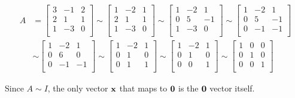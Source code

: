 \documentclass[12pt]{article}
\renewcommand{\vec}[1]{
  {\bf #1}
}
\begin{document}
  {
    \begin{align*}
      A &=
      \begin{bmatrix}
        3 & -1 & 2 \\
        2 &  1 & 1 \\
        1 & -3 & 0 \\
      \end{bmatrix}
      \sim 
      \begin{bmatrix}
        1 & -2 & 1 \\
        2 &  1 & 1 \\
        1 & -3 & 0 \\
      \end{bmatrix}
      \sim 
      \begin{bmatrix}
        1 & -2 &  1 \\
        0 &  5 & -1 \\
        1 & -3 &  0 \\
      \end{bmatrix}
      \sim 
      \begin{bmatrix}
        1 & -2 &  1 \\
        0 &  5 & -1 \\
        0 & -1 & -1 \\
      \end{bmatrix} \\
      &\sim 
      \begin{bmatrix}
        1 & -2 &  1 \\
        0 &  6 &  0 \\
        0 & -1 & -1 \\
      \end{bmatrix}
      \sim 
      \begin{bmatrix}
        1 & -2 &  1 \\
        0 &  1 &  0 \\
        0 &  1 &  1 \\
      \end{bmatrix}
      \sim 
      \begin{bmatrix}
        1 & -2 &  1 \\
        0 &  1 &  0 \\
        0 &  0 &  1 \\
      \end{bmatrix}
      \sim 
      \begin{bmatrix}
        1 &  0 &  0 \\
        0 &  1 &  0 \\
        0 &  0 &  1 \\
      \end{bmatrix}
    \end{align*}

    Since $A \sim I$, the only vector $\vec{x}$ that maps to $\vec{0}$ is the
    $\vec{0}$ vector itself.
  }
\end{document}
